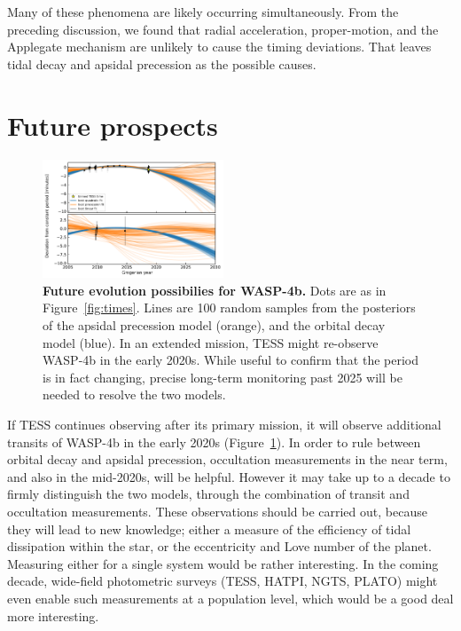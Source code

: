 \documentclass[12pt,twocolumn,tighten]{aastex62}
\begin{document}
Many of these phenomena are likely occurring simultaneously.  From the
preceding discussion, we found that radial acceleration,
proper-motion, and the Applegate mechanism are unlikely to cause the
timing deviations.  That leaves tidal decay and apsidal precession as
the possible causes.



\section{Future prospects}
\label{sec:future}

\begin{figure}[!t]
	\begin{center}
		\leavevmode
		\includegraphics[width=0.48\textwidth]{f5.pdf}
	\end{center}
  \vspace{-0.5cm}
	\caption{
		{\bf Future evolution possibilies for WASP-4b.}
		Dots are as in Figure~\ref{fig:times}.
		Lines are 100 random samples from the posteriors of the apsidal
		precession model (orange), and the orbital decay model (blue).
		In an extended mission, TESS might re-observe WASP-4b in the early
		2020s. While useful to confirm that the period is
		in fact changing, precise long-term monitoring past 2025 will
		be needed to resolve the two models.
		\label{fig:future}
	}
\end{figure}

If TESS continues observing after its primary mission, it will observe
additional transits of WASP-4b in the early 2020s
(Figure~\ref{fig:future}).  In order to rule between orbital decay and
apsidal precession, occultation measurements in the near term, and
also in the mid-2020s, will be helpful.  However it may take up to a
decade to firmly distinguish the two models, through the combination
of transit and occultation measurements.  These observations should be
carried out, because they will lead to new knowledge; either a measure
of the efficiency of tidal dissipation within the star, or the
eccentricity and Love number of the planet.  Measuring either for a
single system would be rather interesting.  In the coming decade,
wide-field photometric surveys (TESS, HATPI, NGTS, PLATO) might even
enable such measurements at a population level, which would be a good
deal more interesting.
\end{document}
